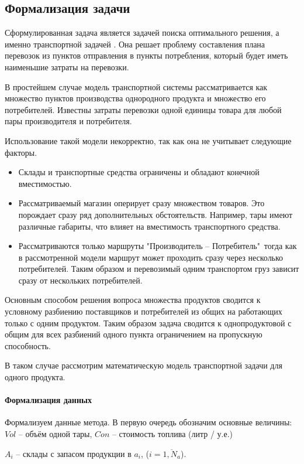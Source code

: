 \subsection{Формализация задачи}
	Сформулированная задача является задачей поиска оптимального решения, а именно транспортной задачей \cite{trans:main}. Она решает проблему составления плана перевозок из пунктов отправления в пункты потребления, который будет иметь наименьшие затраты на перевозки. 
	
	В простейшем случае модель транспортной системы рассматривается как множество пунктов производства однородного продукта и множество его потребителей. Известны затраты перевозки одной единицы товара для любой пары производителя и потребителя.
	
	Использование такой модели некорректно, так как она не учитывает следующие факторы.
	\begin{itemize}
		\item Склады и транспортные средства ограничены и обладают конечной вместимостью.
		\item Рассматриваемый магазин оперирует сразу множеством товаров. Это порождает сразу ряд дополнительных обстоятельств. Например, тары имеют различные габариты, что влияет на вместимость транспортного средства.
		\item Рассматриваются только маршруты "Производитель -- Потребитель"\, тогда как в рассмотренной модели маршрут может проходить сразу через несколько потребителей. Таким образом и перевозимый одним транспортом груз зависит сразу от нескольких потребителей.
	\end{itemize}
		
	Основным способом решения вопроса множества продуктов сводится к условному разбиению поставщиков и потребителей из общих на работающих только с одним продуктом. Таким образом задача сводится к однопродуктовой с общим для всех разбиений одного пункта ограничением на пропускную способность.
	
	В таком случае рассмотрим математическую модель транспортной задачи для одного продукта.
	\paragraph{Формализация данных}
	Формализуем данные метода. В первую очередь обозначим основные величины: $Vol$ -- объём одной тары, $Con$ -- стоимость топлива (литр / у.е.)
	
	$A_i$ -- склады с запасом продукции в $a_i$, ($i = \overline{1, N_a}$).
	
